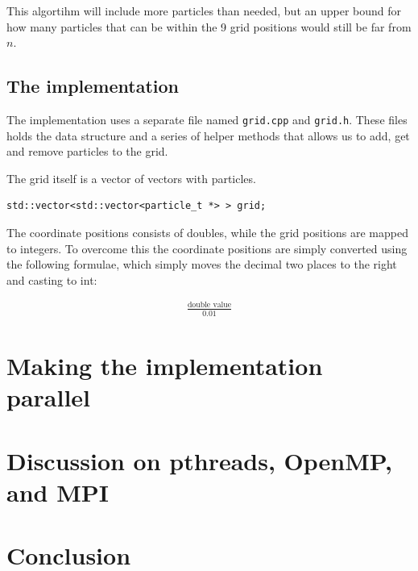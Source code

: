 \documentclass[a4paper,11pt,oneside]{book}
\begin{document}
This algortihm will include more particles than needed, but an upper bound for how many particles that can be within the 9 grid positions would still be far from $n$.

\section{The implementation}
The implementation uses a separate file named \verb!grid.cpp! and \verb!grid.h!. These files holds the data structure and a series of helper methods that allows us to add, get and remove particles to the grid.

The grid itself is 	a vector of vectors with particles.

\begin{verbatim}
std::vector<std::vector<particle_t *> > grid;
\end{verbatim}

The coordinate positions consists of doubles, while the grid positions are mapped to integers. To overcome this the coordinate positions are simply converted using the following formulae, which simply moves the decimal two places to the right and casting to int:

\begin{align*}
\frac{\text{double value}}{0.01}
\end{align*}

\chapter{Making the implementation parallel}


\chapter{Discussion on pthreads, OpenMP, and MPI}


\chapter{Conclusion}


\end{document}
